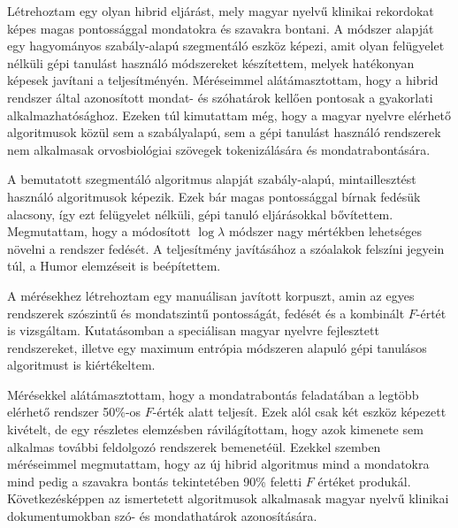 % 
% 



\begin{core}
\begin{thesis}%
Létrehoztam egy olyan hibrid eljárást, mely magyar nyelvű klinikai rekordokat képes magas pontossággal mondatokra és szavakra bontani. 
A módszer alapját egy hagyományos szabály-alapú szegmentáló eszköz képezi, amit olyan felügyelet nélküli gépi tanulást használó módszereket készítettem, melyek hatékonyan képesek javítani a teljesítményén.
Méréseimmel alátámasztottam, hogy a hibrid rendszer által azonosított mondat- és szóhatárok kellően pontosak a gyakorlati alkalmazhatósághoz.
Ezeken túl kimutattam még, hogy a magyar nyelvre elérhető algoritmusok közül sem a szabályalapú, sem a gépi tanulást használó rendszerek nem alkalmasak orvosbiológiai szövegek tokenizálására és mondatrabontására.
\end{thesis}

\begin{pub}
\cite{Orosz2013d, Orosz2014a}
\end{pub}
\end{core}

A bemutatott szegmentáló algoritmus alapját szabály-alapú, mintaillesztést használó algoritmusok képezik. 
Ezek bár magas pontossággal bírnak fedésük alacsony, így ezt felügyelet nélküli, gépi tanuló eljárásokkal bővítettem.
Megmutattam, hogy a módosított $\log \lambda$ módszer nagy mértékben lehetséges növelni a rendszer fedését. 
A teljesítmény javításához a szóalakok felszíni jegyein túl, a Humor elemzéseit is beépítettem.


A mérésekhez létrehoztam egy manuálisan javított korpuszt, amin az egyes rendszerek szószintű és mondatszintű pontosságát, fedését és a kombinált $F$-értét is vizsgáltam.  
Kutatásomban a speciálisan magyar nyelvre fejlesztett rendszereket, illetve egy maximum entrópia módszeren alapuló gépi tanulásos algoritmust is kiértékeltem.

Mérésekkel alátámasztottam, hogy a mondatrabontás feladatában a legtöbb elérhető rendszer 50\%-os $F$-érték alatt teljesít. 
Ezek alól csak két eszköz képezett kivételt, de egy részletes elemzésben rávilágítottam, hogy azok kimenete sem alkalmas további feldolgozó rendszerek bemenetéül.
Ezekkel szemben méréseimmel megmutattam, hogy az új hibrid algoritmus mind a mondatokra mind pedig a szavakra bontás tekintetében 90\% feletti $F$ értéket produkál. 
Következésképpen az ismertetett algoritmusok alkalmasak magyar nyelvű klinikai dokumentumokban szó- és mondathatárok azonosítására.


